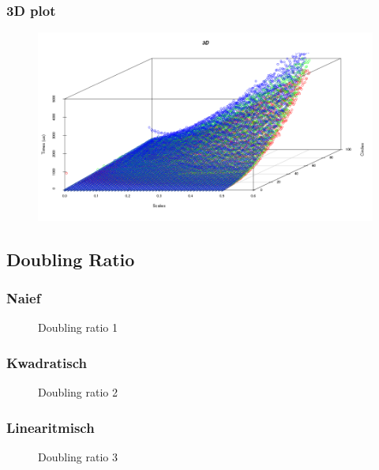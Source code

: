 \subsubsection{3D plot}
\begin{figure}[H]
   \centering
   \includegraphics[width=\textwidth]{illustraties/3DScatter.png}
\end{figure}

\subsection{Doubling Ratio}
\subsubsection{Naief}
\begin{figure}[H]

\label{doublingratio_1}
\caption{Doubling ratio 1}
\end{figure}

\subsubsection{Kwadratisch}
\begin{figure}[H]

\label{doublingratio_2}
\caption{Doubling ratio 2}
\end{figure}

\subsubsection{Linearitmisch}
\begin{figure}[h]

\label{doublingratio_3}
\caption{Doubling ratio 3}
\end{figure}
